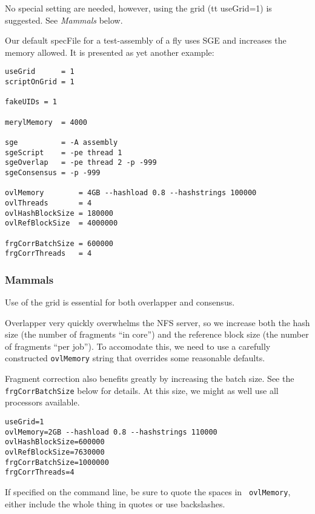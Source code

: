 \documentclass[twoside,11pt]{article}
\begin{document}
No special setting are needed, however, using the grid ({tt
useGrid=1}) is suggested.  See {\em Mammals} below.

Our default specFile for a test-assembly of a fly uses SGE and
increases the memory allowed.  It is presented as yet another example:

\begin{verbatim}
useGrid      = 1
scriptOnGrid = 1

fakeUIDs = 1

merylMemory  = 4000

sge          = -A assembly
sgeScript    = -pe thread 1
sgeOverlap   = -pe thread 2 -p -999
sgeConsensus = -p -999

ovlMemory        = 4GB --hashload 0.8 --hashstrings 100000
ovlThreads       = 4
ovlHashBlockSize = 180000
ovlRefBlockSize  = 4000000

frgCorrBatchSize = 600000
frgCorrThreads   = 4
\end{verbatim}

\subsubsection{Mammals}

Use of the grid is essential for both overlapper and consensus.

Overlapper very quickly overwhelms the NFS server, so we increase both
the hash size (the number of fragments ``in core'') and the reference
block size (the number of fragments ``per job'').  To accomodate this,
we need to use a carefully constructed {\tt ovlMemory} string that
overrides some reasonable defaults.

Fragment correction also benefits greatly by increasing the batch
size.  See the {\tt frgCorrBatchSize} below for details.  At this
size, we might as well use all processors available.

\begin{verbatim}
useGrid=1
ovlMemory=2GB --hashload 0.8 --hashstrings 110000
ovlHashBlockSize=600000
ovlRefBlockSize=7630000
frgCorrBatchSize=1000000
frgCorrThreads=4
\end{verbatim}

If specified on the command line, be sure to quote the spaces in {\tt
ovlMemory}, either include the whole thing in quotes or use backslashes.

\end{document}

